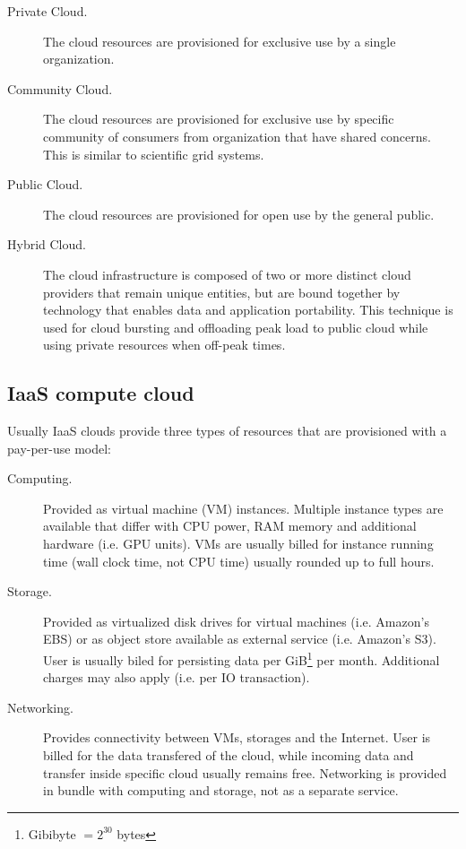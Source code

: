 \begin{description}
  \item[Private Cloud.] The cloud resources are provisioned for exclusive use by a single organization.
  \item[Community Cloud.] The cloud resources are provisioned for exclusive use by specific community of consumers from organization that have shared concerns. This is similar to scientific grid systems.
  \item[Public Cloud.] The cloud resources are provisioned for open use by the general public.
  \item[Hybrid Cloud.] The cloud infrastructure is composed of two or more distinct cloud providers that remain unique entities, but are bound together by technology that enables data and application portability. This technique is used for cloud bursting and offloading peak load to public cloud while using private resources when off-peak times.
\end{description}

\subsection{IaaS compute cloud}

Usually IaaS clouds provide three types of resources that are provisioned with a pay-per-use model: 
\begin{description}
  \item[Computing.] Provided as virtual machine (VM) instances. Multiple instance types are available that differ with CPU power, RAM memory and additional hardware (i.e. GPU units). VMs are usually billed for instance running time (wall clock time, not CPU time) usually rounded up to full hours.
  \item[Storage.] Provided as virtualized disk drives for virtual machines (i.e. Amazon's EBS) or as object store available as external service (i.e. Amazon's S3). User is usually biled for persisting data per GiB\footnote{Gibibyte $= 2^{30}$ bytes} per month. Additional charges may also apply (i.e. per IO transaction).
  \item[Networking.] Provides connectivity between VMs, storages and the Internet. User is billed for the data transfered of the cloud, while incoming data and transfer inside specific cloud usually remains free. Networking is provided in bundle with computing and storage, not as a separate service.
\end{description}

